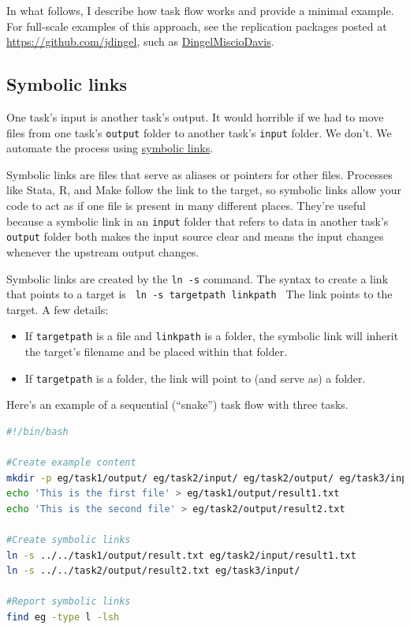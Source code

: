 In what follows, I describe how task flow works and provide a minimal example.
For full-scale examples of this approach, see the replication packages posted at \url{https://github.com/jdingel},
such as \href{https://github.com/jdingel/DingelMiscioDavis}{DingelMiscioDavis}.

\subsection{Symbolic links}

One task's input is another task's output.
It would horrible if we had to move files from one task's \texttt{output} folder to another task's \texttt{input} folder.
We don't.
We automate the process using \href{https://en.wikipedia.org/wiki/Symbolic_link\#POSIX_and_Unix-like_operating_systems}{symbolic links}.

Symbolic links are files that serve as aliases or pointers for other files.
Processes like Stata, R, and Make follow the link to the target,
so symbolic links allow your code to act as if one file is present in many different places.
They're useful because a symbolic link in an \texttt{input} folder that refers to data in another task's \texttt{output} folder 
both makes the input source clear and means the input changes whenever the upstream output changes.

Symbolic links are created by the \texttt{ln -s} command.
The syntax to create a link that points to a target is
\texttt{
ln -s targetpath linkpath
}
The link points to the target. A few details:
\begin{itemize}
	\item If \texttt{targetpath} is a file and \texttt{linkpath} is a folder, the symbolic link will inherit the target's filename and be placed within that folder.
	\item If \texttt{targetpath} is a folder, the link will point to (and serve as) a folder.
\end{itemize}

Here's an example of a sequential (``snake'') task flow with three tasks.
\begin{lstlisting}[language=bash]
#!/bin/bash

#Create example content
mkdir -p eg/task1/output/ eg/task2/input/ eg/task2/output/ eg/task3/input/
echo 'This is the first file' > eg/task1/output/result1.txt
echo 'This is the second file' > eg/task2/output/result2.txt

#Create symbolic links
ln -s ../../task1/output/result.txt eg/task2/input/result1.txt
ln -s ../../task2/output/result2.txt eg/task3/input/

#Report symbolic links
find eg -type l -lsh
\end{lstlisting}

